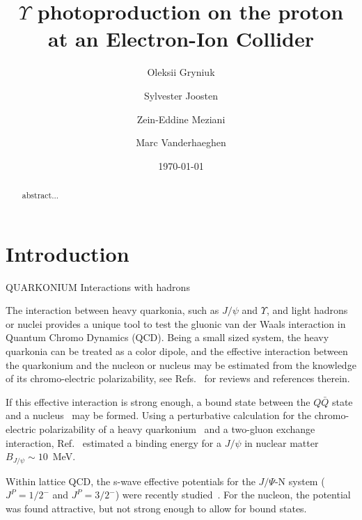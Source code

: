 \documentclass[10pt,prd,aps,nofootinbib,superscriptaddress]{revtex4}
\begin{document}
\title{$\Upsilon$ photoproduction on the proton at an Electron-Ion Collider}
\author{Oleksii Gryniuk}
\author{Sylvester Joosten}
\author{Zein-Eddine Meziani}
\author{Marc Vanderhaeghen}
\noaffiliation
\date{\today}

\begin{abstract}
abstract...
\end{abstract}

\maketitle

\tableofcontents


\section{Introduction}

QUARKONIUM Interactions with hadrons

The interaction between heavy quarkonia, such as $J/\psi$ and $\Upsilon$, and light hadrons or nuclei provides a unique tool to test the gluonic van der Waals interaction in Quantum Chromo Dynamics (QCD). Being a small sized system, the heavy quarkonia can be treated as a color dipole, and the effective interaction between the quarkonium and the nucleon or nucleus may be estimated from the knowledge of its chromo-electric polarizability, see 
Refs.~\cite{Kharzeev:1995ij,Voloshin:2007dx,Hosaka:2016ypm} for reviews and references therein. 

If this effective interaction is strong enough, 
a bound state between the
$Q \bar Q$ state and a nucleus~\cite{Brodsky:1989jd, Wasson:1991fb, Luke:1992tm} may be formed. 
Using a perturbative calculation for the chromo-electric polarizability of a heavy quarkonium~\cite{Peskin:1979va} 
and a two-gluon exchange interaction, 
Ref.~\cite{Luke:1992tm} estimated a binding energy for a $J/\psi$ in nuclear matter $B_{J/\psi} \sim 10$~MeV.  

Within lattice QCD, the s-wave effective potentials for the  
$J/\Psi$-N system ($J^P = 1/2^-$ and $J^P = 3/2^-$) were recently studied~\cite{Sugiura:2017vks}. For the nucleon, the potential was found attractive, but not strong enough to allow for bound states. 
\end{document}
